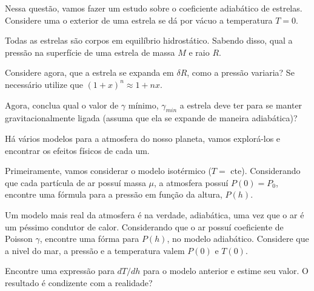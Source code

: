 \documentclass[11pt]{article}
\begin{document}
\begin{pproblem}
    Nessa questão, vamos fazer um estudo sobre o coeficiente adiabático de estrelas. Considere uma o exterior de uma estrela se dá por vácuo a temperatura \(T=0\).
    \begin{alternativas}
        \item Todas as estrelas são corpos em equilíbrio hidrostático. Sabendo disso, qual a pressão na superfície de uma estrela de massa \(M\) e raio \(R\).
        \item Considere agora, que a estrela se expanda em \(\delta R\), como a pressão variaria? Se necessário utilize que \((1+x)^n\approx 1+nx\).
        \item Agora, conclua qual o valor de \(\gamma\) mínimo, \(\gamma_{min}\) a estrela deve ter para se manter gravitacionalmente ligada (assuma que ela se expande de maneira adiabática)?
    \end{alternativas}


\end{pproblem}

\begin{pproblem}
    Há vários modelos para a atmosfera do nosso planeta, vamos explorá-los e encontrar os efeitos físicos de cada um.
    \begin{alternativas}
        \item Primeiramente, vamos considerar o modelo isotérmico (\(T=\) cte). Considerando que cada partícula de ar possuí massa \(\mu\), a atmosfera possuí \(P(0) = P_0\), encontre uma fórmula para a pressão em função da altura, \(P(h)\).
        \item Um modelo mais real da atmosfera é na verdade, adiabática, uma vez que o ar é um péssimo condutor de calor. Considerando que o ar possuí coeficiente de Poisson \(\gamma\), encontre uma fórma para \(P(h)\), no modelo adiabático. Considere que a nivel do mar, a pressão e a temperatura valem \(P(0)\) e \(T(0)\).
        \item Encontre uma expressão para \(dT/dh\) para o modelo anterior e estime seu valor. O resultado é condizente com a realidade?
    \end{alternativas}


\end{pproblem}
\end{document}
